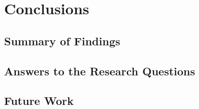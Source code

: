 \chapter{Conclusions}
\label{chap:conclusions}

\section{Summary of Findings}
\label{sec:summary-findings}

\section{Answers to the Research Questions}
\label{sec:answers-rq}

\section{Future Work}
\label{sec:future-work}
